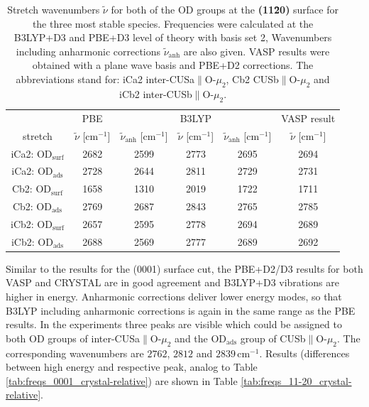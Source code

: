 \documentclass[11pt,DIV=13,BCOR=5mm,a4paper,headinclude]{scrbook}
\begin{document}
\begin{table}[!h]
  \centering
  \caption{Stretch wavenumbers $\tilde{\nu}$ for both of the OD groups at the \textbf{(11\=20)} surface for the three most stable species.
Frequencies were calculated at the B3LYP+D3 and PBE+D3 level of theory with basis set 2, Wavenumbers including anharmonic corrections $\tilde{\nu}_\textrm{anh}$ are also given.
VASP results were obtained with a plane wave basis and PBE+D2 corrections.
The abbreviations stand for: iCa2 inter-CUSa$\parallel$O-$\mu_2$, Cb2 CUSb$\parallel$O-$\mu_2$ and iCb2 inter-CUSb$\parallel$O-$\mu_2$.}
  \begin{tabular}{ccc|cc|c}
  \toprule
   & PBE& & B3LYP & &VASP result\\
  stretch & $\tilde{\nu}$ [cm$^{-1}$] &$\tilde{\nu}_\textrm{anh}$ [cm$^{-1}$] &$\tilde{\nu}$ [cm$^{-1}$] & $\tilde{\nu}_\textrm{anh}$ [cm$^{-1}$]&$\tilde{\nu}$ [cm$^{-1}$]\\\midrule
  iCa2: OD$_{\textrm{surf}}$ &2682 &2599 &2773 &2695 & 2694\\
  iCa2: OD$_{\textrm{ads}}$  &2728 &2644 &2811 &2729 & 2731\\
  Cb2: OD$_{\textrm{surf}}$  &1658 &1310 &2019 &1722 & 1711\\
  Cb2: OD$_{\textrm{ads}}$   &2769 &2687 &2843 &2765 & 2785\\
  iCb2: OD$_{\textrm{surf}}$ &2657 &2595 &2778 &2694 & 2689\\
  iCb2: OD$_{\textrm{ads}}$  &2688 &2569 &2777 &2689 & 2692\\\bottomrule
  \end{tabular}
  \label{tab:freqs_11-20_crystal}
\end{table}
Similar to the results for the (0001) surface cut, the PBE+D2/D3 results for both VASP and CRYSTAL are in good agreement and B3LYP+D3 vibrations are higher in energy.
Anharmonic corrections deliver lower energy modes, so that B3LYP including anharmonic corrections is again in the same range as the PBE results.
In the experiments \cite{Heiden11-20_2018} three peaks are visible which could be assigned to both OD groups of inter-CUSa$\parallel$O-$\mu_2$ and the OD$_\textrm{ads}$ group of CUSb$\parallel$O-$\mu_2$.
The corresponding wavenumbers are $2762$, $2812$ and $2839\,$cm$^{-1}$.
Results (differences between high energy and respective peak, analog to Table \ref{tab:freqs_0001_crystal-relative}) are shown in Table \ref{tab:freqs_11-20_crystal-relative}.
\end{document}
